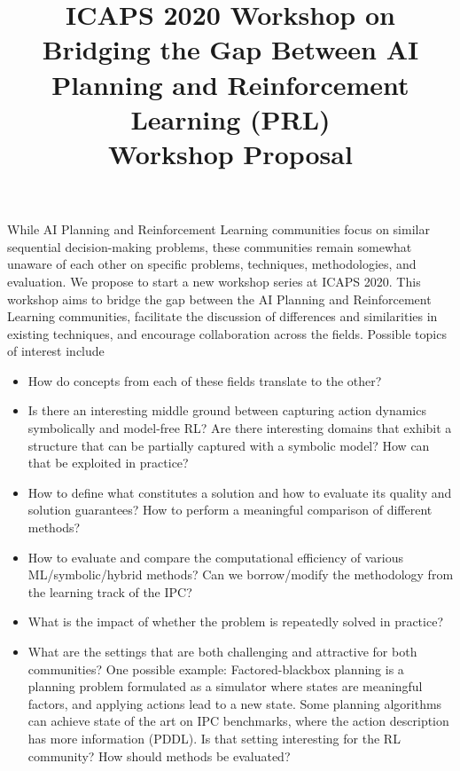 \documentclass[10pt]{article}
\begin{document}
\title{ICAPS 2020 Workshop on \\ Bridging the Gap Between AI Planning and Reinforcement Learning (PRL)\\ \vspace*{0.7cm} Workshop Proposal
}
\date{}

\author{}

\maketitle

While AI Planning and Reinforcement Learning communities focus on similar
sequential decision-making problems, these communities remain somewhat unaware
of each other on specific problems, techniques, methodologies, and evaluation.
%
We propose to start a new workshop series at ICAPS 2020. This workshop aims to
bridge the gap between the AI Planning and Reinforcement Learning communities,
facilitate the discussion of differences and similarities in existing techniques,
and encourage collaboration across the fields. 
%
Possible topics of interest include
\begin{itemize}
\item How do concepts from each of these fields translate to the other?
%
\item Is there an interesting middle ground between capturing action dynamics
symbolically and model-free RL? Are there interesting domains that exhibit a
structure that can be partially captured with a symbolic model? How can that be
exploited in practice?
%
\item How to define what constitutes a solution and how to evaluate its quality
and solution guarantees? How to perform a meaningful comparison of different
methods?
%
\item How to evaluate and compare the computational efficiency of various
ML/symbolic/hybrid methods? Can we borrow/modify the methodology from the
learning track of the IPC?
%
\item What is the impact of whether the problem is repeatedly solved in
practice?
%
\item What are the settings that are both challenging and attractive for both
communities? 
%
One possible example: Factored-blackbox planning is a planning problem
formulated as a simulator where states are meaningful factors, and applying
actions lead to a new state. Some planning algorithms can achieve state of the
art on IPC benchmarks, where the action description has more information (PDDL).
Is that setting interesting for the RL community? How should methods be
evaluated?
\end{itemize}
\end{document}
